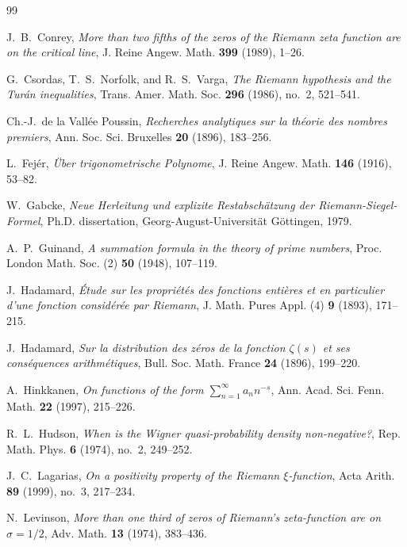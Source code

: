 \documentclass[11pt,reqno]{amsart}
\theoremstyle{definition}
\theoremstyle{remark}
\numberwithin{equation}{section}
\begin{document}
\begin{thebibliography}{99}

J.~B.~Conrey,
\emph{More than two fifths of the zeros of the Riemann zeta function are on the critical line},
J. Reine Angew. Math. \textbf{399} (1989), 1--26.

G.~Csordas, T.~S.~Norfolk, and R.~S.~Varga,
\emph{The Riemann hypothesis and the Tur\'an inequalities},
Trans. Amer. Math. Soc. \textbf{296} (1986), no.~2, 521--541.

Ch.-J.~de la Vall\'ee Poussin,
\emph{Recherches analytiques sur la th\'eorie des nombres premiers},
Ann. Soc. Sci. Bruxelles \textbf{20} (1896), 183--256.

L.~Fej\'er,
\emph{\"Uber trigonometrische Polynome},
J. Reine Angew. Math. \textbf{146} (1916), 53--82.

W.~Gabcke,
\emph{Neue Herleitung und explizite Restabsch\"atzung der Riemann-Siegel-Formel},
Ph.D. dissertation, Georg-August-Universit\"at G\"ottingen, 1979.

A.~P.~Guinand,
\emph{A summation formula in the theory of prime numbers},
Proc. London Math. Soc. (2) \textbf{50} (1948), 107--119.

J.~Hadamard,
\emph{\'Etude sur les propri\'et\'es des fonctions enti\`eres et en particulier d'une fonction consid\'er\'ee par Riemann},
J. Math. Pures Appl. (4) \textbf{9} (1893), 171--215.

J.~Hadamard,
\emph{Sur la distribution des z\'eros de la fonction $\zeta(s)$ et ses cons\'equences arithm\'etiques},
Bull. Soc. Math. France \textbf{24} (1896), 199--220.

A.~Hinkkanen,
\emph{On functions of the form $\sum_{n=1}^{\infty} a_n n^{-s}$},
Ann. Acad. Sci. Fenn. Math. \textbf{22} (1997), 215--226.

R.~L.~Hudson,
\emph{When is the Wigner quasi-probability density non-negative?},
Rep. Math. Phys. \textbf{6} (1974), no.~2, 249--252.

J.~C.~Lagarias,
\emph{On a positivity property of the Riemann $\xi$-function},
Acta Arith. \textbf{89} (1999), no.~3, 217--234.

N.~Levinson,
\emph{More than one third of zeros of Riemann's zeta-function are on $\sigma = 1/2$},
Adv. Math. \textbf{13} (1974), 383--436.


\end{thebibliography}
\end{document}
